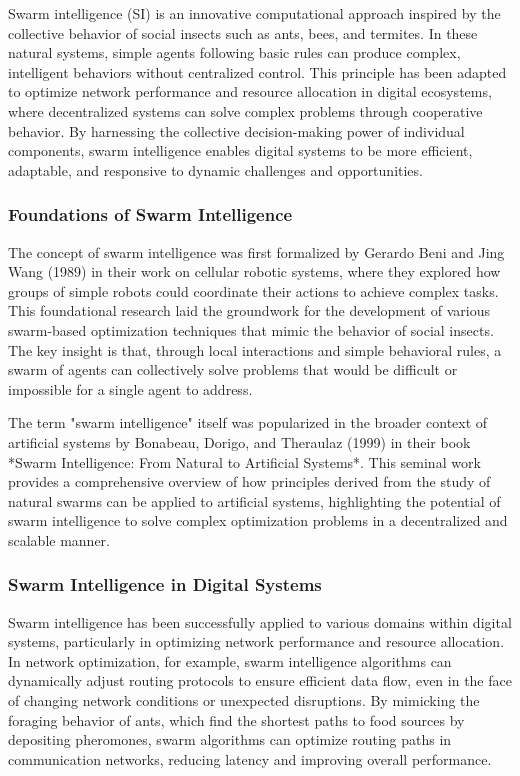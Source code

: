 \documentclass[12pt,twoside]{article}
\begin{document}
Swarm intelligence (SI) is an innovative computational approach inspired by the collective behavior of social insects such as ants, bees, and termites. In these natural systems, simple agents following basic rules can produce complex, intelligent behaviors without centralized control. This principle has been adapted to optimize network performance and resource allocation in digital ecosystems, where decentralized systems can solve complex problems through cooperative behavior. By harnessing the collective decision-making power of individual components, swarm intelligence enables digital systems to be more efficient, adaptable, and responsive to dynamic challenges and opportunities.

\subsubsection{Foundations of Swarm Intelligence}

The concept of swarm intelligence was first formalized by Gerardo Beni and Jing Wang (1989) in their work on cellular robotic systems, where they explored how groups of simple robots could coordinate their actions to achieve complex tasks. This foundational research laid the groundwork for the development of various swarm-based optimization techniques that mimic the behavior of social insects. The key insight is that, through local interactions and simple behavioral rules, a swarm of agents can collectively solve problems that would be difficult or impossible for a single agent to address.

The term "swarm intelligence" itself was popularized in the broader context of artificial systems by Bonabeau, Dorigo, and Theraulaz (1999) in their book *Swarm Intelligence: From Natural to Artificial Systems*. This seminal work provides a comprehensive overview of how principles derived from the study of natural swarms can be applied to artificial systems, highlighting the potential of swarm intelligence to solve complex optimization problems in a decentralized and scalable manner.

\subsubsection{Swarm Intelligence in Digital Systems}

Swarm intelligence has been successfully applied to various domains within digital systems, particularly in optimizing network performance and resource allocation. In network optimization, for example, swarm intelligence algorithms can dynamically adjust routing protocols to ensure efficient data flow, even in the face of changing network conditions or unexpected disruptions. By mimicking the foraging behavior of ants, which find the shortest paths to food sources by depositing pheromones, swarm algorithms can optimize routing paths in communication networks, reducing latency and improving overall performance.
\end{document}
